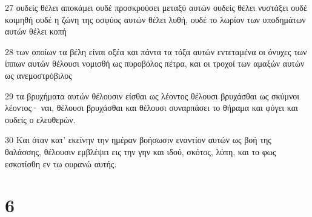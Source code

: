 \par 27 ουδείς θέλει αποκάμει ουδέ προσκρούσει μεταξύ αυτών ουδείς θέλει νυστάξει ουδέ κοιμηθή ουδέ η ζώνη της οσφύος αυτών θέλει λυθή, ουδέ το λωρίον των υποδημάτων αυτών θέλει κοπή
\par 28 των οποίων τα βέλη είναι οξέα και πάντα τα τόξα αυτών εντεταμένα οι όνυχες των ίππων αυτών θέλουσι νομισθή ως πυροβόλος πέτρα, και οι τροχοί των αμαξών αυτών ως ανεμοστρόβιλος
\par 29 τα βρυχήματα αυτών θέλουσιν είσθαι ως λέοντος θέλουσι βρυχάσθαι ως σκύμνοι λέοντος· ναι, θέλουσι βρυχάσθαι και θέλουσι συναρπάσει το θήραμα και φύγει και ουδείς ο ελευθερών.
\par 30 Και όταν κατ' εκείνην την ημέραν βοήσωσιν εναντίον αυτών ως βοή της θαλάσσης, θέλουσιν εμβλέψει εις την γην και ιδού, σκότος, λύπη, και το φως εσκοτίσθη εν τω ουρανώ αυτής.

\chapter{6}


